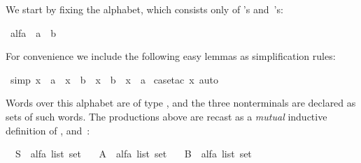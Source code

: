 \begin{isabellebody}
\begin{isamarkuptext}
We start by fixing the alphabet, which consists only of 's
and~'s:%
\end{isamarkuptext}%
\isamarkuptrue%
\isamarkupfalse%
\ alfa\ {}\ a\ {}\ b%
\begin{isamarkuptext}%
\noindent
For convenience we include the following easy lemmas as simplification rules:%
\end{isamarkuptext}%
\isamarkuptrue%
\isamarkupfalse%
\ {}simp{}{}\ {}{}x\ {}\ a{}\ {}\ {}x\ {}\ b{}\ {}\ {}x\ {}\ b{}\ {}\ {}x\ {}\ a{}{}\isanewline
%
\isadelimproof
%
\endisadelimproof
%
\isatagproof
{}\isamarkupfalse%
\ {}case{}tac\ x{}\ auto{}%
\endisatagproof
{\isafoldproof}%
%
\isadelimproof
%
\endisadelimproof
%
\begin{isamarkuptext}%
\noindent
Words over this alphabet are of type , and
the three nonterminals are declared as sets of such words.
The productions above are recast as a \emph{mutual} inductive
definition
of ,  and~:%
\end{isamarkuptext}%
\isamarkuptrue%
\isamarkupfalse%
\isanewline
\ \ S\ {}{}\ {}alfa\ list\ set{}\ \isanewline
\ \ A\ {}{}\ {}alfa\ list\ set{}\ \isanewline
\ \ B\ {}{}\ {}alfa\ list\ set{}\isanewline

\end{isabellebody}
